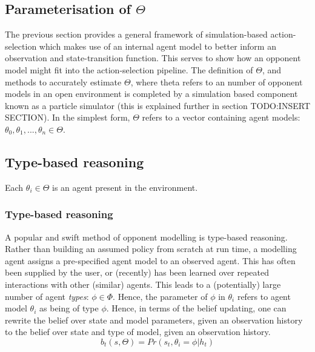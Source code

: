 \subsection{Parameterisation of $\Theta$} \label{IncludingAgentModels}
The previous section provides a general framework of simulation-based action-selection which makes use of an internal agent model to better inform an observation and state-transition function. This serves to show how an opponent model might fit into the action-selection pipeline.
\newline \newline
The definition of $\Theta$, and methods to accurately estimate $\Theta$, where theta refers to an number of opponent models in an open environment is completed by a simulation based component known as a particle simulator (this is explained further in section TODO:INSERT SECTION).
\newline\newline
In the simplest form, $\Theta$ refers to a vector containing agent models: ${\theta_0, \theta_1,...,\theta_n} \in \Theta$. 
\subsection{Type-based reasoning}
Each $\theta_i \in \Theta$ is an agent present in the environment.    
\subsubsection{Type-based reasoning}
A popular and swift method of opponent modelling is type-based reasoning. Rather than building an assumed policy from scratch at run time, a modelling agent assigns a pre-specified agent model to an observed agent. This has often been supplied by the user, or (recently) has been learned over repeated interactions with other (similar) agents. 
This leads to a (potentially) large number of agent \textit{types}: $\phi \in \Phi$.
\newline \newline
Hence, the parameter of $\phi$ in $\theta_i$ refers to agent model $\theta_i$ as being of type $\phi$. 
\newline \newline
Hence, in terms of the belief updating, one can rewrite the belief over state and model parameters, given an observation history to the belief over state and type of model, given an observation history. 
\begin{equation}
    b_t(s,\Theta) = Pr(s_t,\theta_i = \phi | h_t)
\end{equation}





